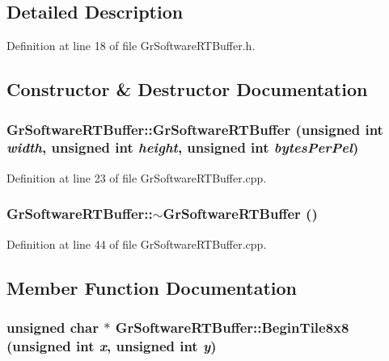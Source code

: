 \subsection{Detailed Description}


Definition at line 18 of file GrSoftwareRTBuffer.h.

\subsection{Constructor \& Destructor Documentation}
\hypertarget{class_gr_software_r_t_buffer_017c633b19fa649ce8ce609d6819819c}{
\subsubsection[{GrSoftwareRTBuffer}]{\setlength{\rightskip}{0pt plus 5cm}GrSoftwareRTBuffer::GrSoftwareRTBuffer (unsigned int {\em width}, \/  unsigned int {\em height}, \/  unsigned int {\em bytesPerPel})}}
\label{class_gr_software_r_t_buffer_017c633b19fa649ce8ce609d6819819c}




Definition at line 23 of file GrSoftwareRTBuffer.cpp.\hypertarget{class_gr_software_r_t_buffer_90decbb3ae9cb6c99a3f078b77156311}{
\subsubsection[{$\sim$GrSoftwareRTBuffer}]{\setlength{\rightskip}{0pt plus 5cm}GrSoftwareRTBuffer::$\sim$GrSoftwareRTBuffer ()}}
\label{class_gr_software_r_t_buffer_90decbb3ae9cb6c99a3f078b77156311}




Definition at line 44 of file GrSoftwareRTBuffer.cpp.

\subsection{Member Function Documentation}
\hypertarget{class_gr_software_r_t_buffer_cd1d8af57e8676b94e5e1e5c21fbb4db}{
\subsubsection[{BeginTile8x8}]{\setlength{\rightskip}{0pt plus 5cm}unsigned char $\ast$ GrSoftwareRTBuffer::BeginTile8x8 (unsigned int {\em x}, \/  unsigned int {\em y})}}
\label{class_gr_software_r_t_buffer_cd1d8af57e8676b94e5e1e5c21fbb4db}




